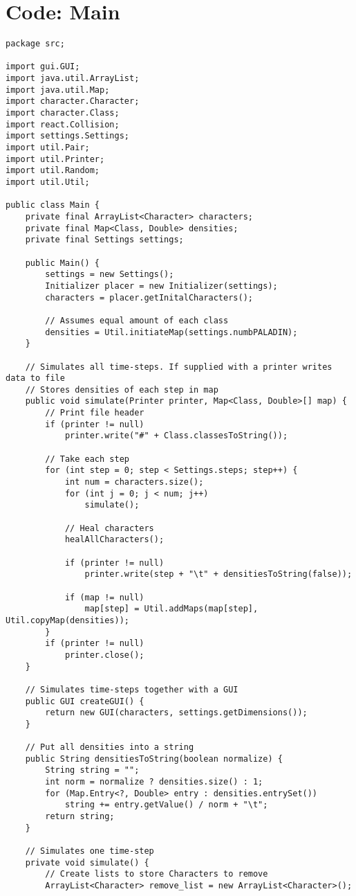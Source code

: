 \documentclass[a4paper,12pt]{article}
\begin{document}
\section{Code: Main}
\begin{lstlisting}
package src;

import gui.GUI;
import java.util.ArrayList;
import java.util.Map;
import character.Character;
import character.Class;
import react.Collision;
import settings.Settings;
import util.Pair;
import util.Printer;
import util.Random;
import util.Util;

public class Main {
	private final ArrayList<Character> characters;
	private final Map<Class, Double> densities;
	private final Settings settings;

	public Main() {
		settings = new Settings();
		Initializer placer = new Initializer(settings);
		characters = placer.getInitalCharacters();

		// Assumes equal amount of each class
		densities = Util.initiateMap(settings.numbPALADIN);
	}

	// Simulates all time-steps. If supplied with a printer writes data to file
	// Stores densities of each step in map
	public void simulate(Printer printer, Map<Class, Double>[] map) {
		// Print file header
		if (printer != null)
			printer.write("#" + Class.classesToString());

		// Take each step
		for (int step = 0; step < Settings.steps; step++) {
			int num = characters.size();
			for (int j = 0; j < num; j++)
				simulate();

			// Heal characters
			healAllCharacters();

			if (printer != null)
				printer.write(step + "\t" + densitiesToString(false));

			if (map != null)
				map[step] = Util.addMaps(map[step], Util.copyMap(densities));
		}
		if (printer != null)
			printer.close();
	}

	// Simulates time-steps together with a GUI
	public GUI createGUI() {
		return new GUI(characters, settings.getDimensions());
	}

	// Put all densities into a string
	public String densitiesToString(boolean normalize) {
		String string = "";
		int norm = normalize ? densities.size() : 1;
		for (Map.Entry<?, Double> entry : densities.entrySet())
			string += entry.getValue() / norm + "\t";
		return string;
	}

	// Simulates one time-step
	private void simulate() {
		// Create lists to store Characters to remove
		ArrayList<Character> remove_list = new ArrayList<Character>();


\end{lstlisting}
\end{document}
